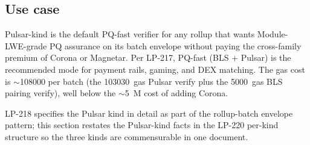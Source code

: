 \subsection{Use case}

Pulsar-kind is the default PQ-fast verifier for any rollup that
wants Module-LWE-grade PQ assurance on its batch envelope
without paying the cross-family premium of Corona or Magnetar.
Per LP-217, PQ-fast (BLS + Pulsar) is the recommended mode for
payment rails, gaming, and DEX matching. The gas cost is
$\sim$\SI{108000}{} per batch (the \SI{103030}{gas} Pulsar verify
plus the \SI{5000}{gas} BLS pairing verify), well below the
$\sim$\SI{5}{M} cost of adding Corona.

LP-218 specifies the Pulsar kind in detail as part of the
rollup-batch envelope pattern; this section restates the
Pulsar-kind facts in the LP-220 per-kind structure so the three
kinds are commensurable in one document.
